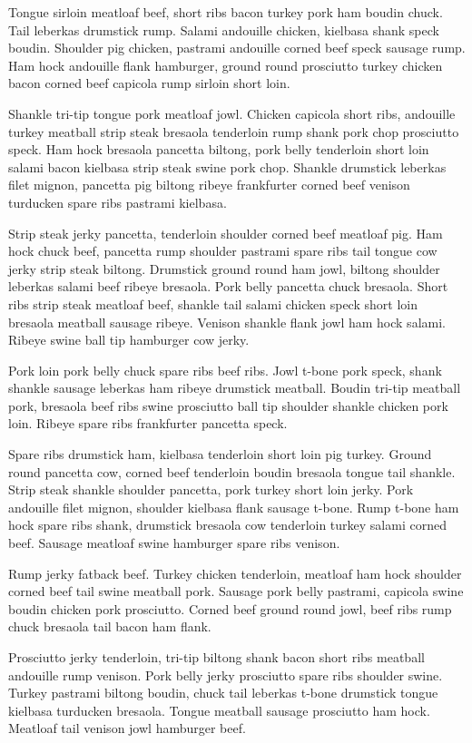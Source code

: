 Tongue sirloin meatloaf beef, short ribs bacon turkey pork ham boudin chuck. Tail leberkas drumstick rump. Salami andouille chicken, kielbasa shank speck boudin. Shoulder pig chicken, pastrami andouille corned beef speck sausage rump. Ham hock andouille flank hamburger, ground round prosciutto turkey chicken bacon corned beef capicola rump sirloin short loin.

Shankle tri-tip tongue pork meatloaf jowl. Chicken capicola short ribs, andouille turkey meatball strip steak bresaola tenderloin rump shank pork chop prosciutto speck. Ham hock bresaola pancetta biltong, pork belly tenderloin short loin salami bacon kielbasa strip steak swine pork chop. Shankle drumstick leberkas filet mignon, pancetta pig biltong ribeye frankfurter corned beef venison turducken spare ribs pastrami kielbasa.

Strip steak jerky pancetta, tenderloin shoulder corned beef meatloaf pig. Ham hock chuck beef, pancetta rump shoulder pastrami spare ribs tail tongue cow jerky strip steak biltong. Drumstick ground round ham jowl, biltong shoulder leberkas salami beef ribeye bresaola. Pork belly pancetta chuck bresaola. Short ribs strip steak meatloaf beef, shankle tail salami chicken speck short loin bresaola meatball sausage ribeye. Venison shankle flank jowl ham hock salami. Ribeye swine ball tip hamburger cow jerky.

Pork loin pork belly chuck spare ribs beef ribs. Jowl t-bone pork speck, shank shankle sausage leberkas ham ribeye drumstick meatball. Boudin tri-tip meatball pork, bresaola beef ribs swine prosciutto ball tip shoulder shankle chicken pork loin. Ribeye spare ribs frankfurter pancetta speck.

Spare ribs drumstick ham, kielbasa tenderloin short loin pig turkey. Ground round pancetta cow, corned beef tenderloin boudin bresaola tongue tail shankle. Strip steak shankle shoulder pancetta, pork turkey short loin jerky. Pork andouille filet mignon, shoulder kielbasa flank sausage t-bone. Rump t-bone ham hock spare ribs shank, drumstick bresaola cow tenderloin turkey salami corned beef. Sausage meatloaf swine hamburger spare ribs venison.

Rump jerky fatback beef. Turkey chicken tenderloin, meatloaf ham hock shoulder corned beef tail swine meatball pork. Sausage pork belly pastrami, capicola swine boudin chicken pork prosciutto. Corned beef ground round jowl, beef ribs rump chuck bresaola tail bacon ham flank.

Prosciutto jerky tenderloin, tri-tip biltong shank bacon short ribs meatball andouille rump venison. Pork belly jerky prosciutto spare ribs shoulder swine. Turkey pastrami biltong boudin, chuck tail leberkas t-bone drumstick tongue kielbasa turducken bresaola. Tongue meatball sausage prosciutto ham hock. Meatloaf tail venison jowl hamburger beef.

